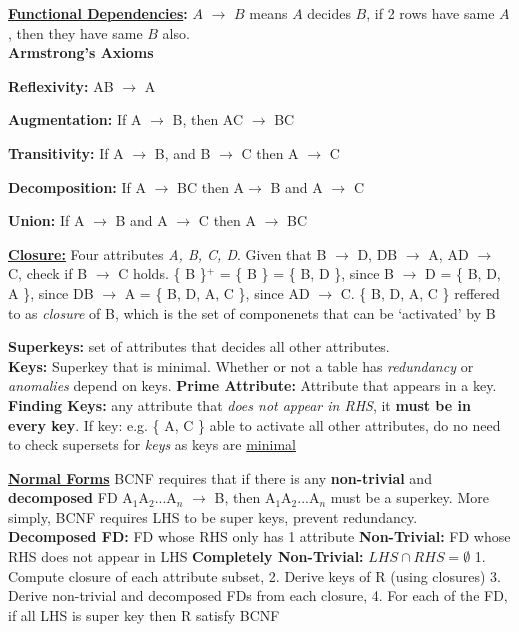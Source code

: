 \documentclass[10pt,landscape]{article}
\begin{document}
\begin{multicols*}{3}
\textbf{\underline{Functional Dependencies}:} $A$ $\rightarrow$ $B$ means $A$ decides $B$, if 2 rows have same $A$, then they have same $B$ also. \\
\textbf{Armstrong's Axioms}
\begin{enumerate}[topsep=0pt,noitemsep,wide=0pt, leftmargin=\dimexpr\labelwidth + 2\labelsep\relax]
    \begin{multicols*}{2}
    \item \textbf{Reflexivity:} AB $\rightarrow$ A
    \item \textbf{Augmentation:} If A $\rightarrow$ B, then AC $\rightarrow$ BC
    \item \textbf{Transitivity:} If A $\rightarrow$ B, and B $\rightarrow$ C then A $\rightarrow$ C
    \item \textbf{Decomposition:} If A $\rightarrow$ BC then A$\rightarrow$ B and A $\rightarrow$ C
    \item \textbf{Union:} If A $\rightarrow$ B and A $\rightarrow$ C then A $\rightarrow$ BC
    \end{multicols*}
\end{enumerate}

\textbf{\underline{Closure:}}
Four attributes \textit{A, B, C, D}. Given that B $\rightarrow$ D, DB $\rightarrow$ A, AD $\rightarrow$ C, check if B $\rightarrow$ C holds.
\{ B \}$^+$ = \{ B \} = \{ B, D \}, since B $\rightarrow$ D
= \{ B, D, A \}, since DB $\rightarrow$ A = \{ B, D, A, C \}, since AD $\rightarrow$ C. \{ B, D, A, C \} reffered to as \textit{closure} of B, which is the set of componenets that can be `activated' by B

\textbf{Superkeys:} set of attributes that decides all other attributes. \\ 
\textbf{Keys:} Superkey that is minimal. Whether or not a table has \textit{redundancy} or \textit{anomalies} depend on keys. \textbf{Prime Attribute:}
Attribute that appears in a key.
\textbf{Finding Keys:} any attribute that \textit{does not appear in RHS}, it \textbf{must be in every key}. 
If key: e.g. \{ A, C \} able to activate all other attributes, do no need to check supersets for \textit{keys} as keys are \underline{minimal}

\textbf{\underline{Normal Forms}}
BCNF requires that if there is any \textbf{non-trivial} and \textbf{decomposed} FD A$_1$A$_2$...A$_n$ $\rightarrow$ B, then A$_1$A$_2$...A$_n$ must be a superkey.
More simply, BCNF requires LHS to be super keys, prevent redundancy. \\ 
\textbf{Decomposed FD:} FD whose RHS only has 1 attribute  
\textbf{Non-Trivial:} FD whose RHS does not appear in LHS 
\textbf{Completely Non-Trivial:} $LHS \cap RHS = \emptyset$
1. Compute closure of each attribute subset, 2. Derive keys of R (using closures)
3. Derive non-trivial and decomposed FDs from each closure, 4. For each of the FD, if all LHS is super key then R satisfy BCNF


\end{multicols*}
\end{document}
